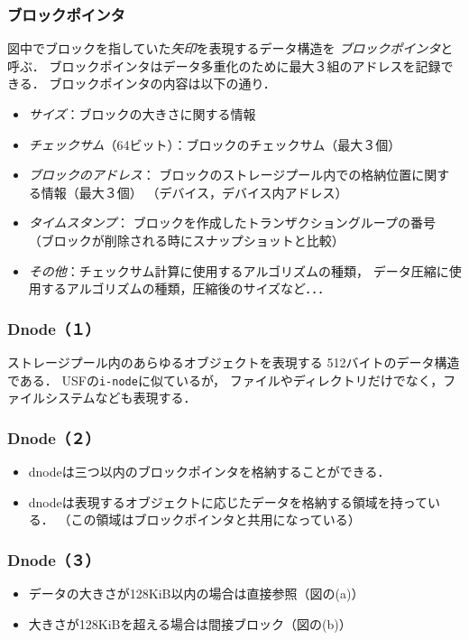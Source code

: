 \documentclass{beamer}                   %
\begin{document}
\begin{frame}[fragile]
  \frametitle{ブロックポインタ}
  図中でブロックを指していた\emph{矢印}を表現するデータ構造を
  \emph{ブロックポインタ}と呼ぶ．
  ブロックポインタはデータ多重化のために最大３組のアドレスを記録できる．
  ブロックポインタの内容は以下の通り．
  \vfill
  \begin{itemize}
  \item \emph{サイズ}：ブロックの大きさに関する情報
  \item \emph{チェックサム}（64ビット）：ブロックのチェックサム（最大３個）
  \item \emph{ブロックのアドレス}：
    ブロックのストレージプール内での格納位置に関する情報（最大３個）
    （デバイス，デバイス内アドレス）
  \item \emph{タイムスタンプ}：
    ブロックを作成したトランザクショングループの番号
    （ブロックが削除される時にスナップショットと比較）
  \item \emph{その他}：チェックサム計算に使用するアルゴリズムの種類，
    データ圧縮に使用するアルゴリズムの種類，圧縮後のサイズなど．．．
  \end{itemize}
  \vfill
\end{frame}

\begin{frame}[fragile]
  \frametitle{Dnode（１）}
  ストレージプール内のあらゆるオブジェクトを表現する
  512バイトのデータ構造である．
  USFの\texttt{i-node}に似ているが，
  ファイルやディレクトリだけでなく，ファイルシステムなども表現する．
  \vfill
\end{frame}

\begin{frame}[fragile]
  \frametitle{Dnode（２）}
  \begin{itemize}
  \item dnodeは三つ以内のブロックポインタを格納することができる．
  \item dnodeは表現するオブジェクトに応じたデータを格納する領域を持っている．
    （この領域はブロックポインタと共用になっている）
  \end{itemize}
  \vfill
\end{frame}

\begin{frame}[fragile]
  \frametitle{Dnode（３）}
  \begin{itemize}
  \item データの大きさが128KiB以内の場合は直接参照（図の(a)）
  \item 大きさが128KiBを超える場合は間接ブロック（図の(b)）
  \end{itemize}
  \vfill
\end{frame}
\end{document}
